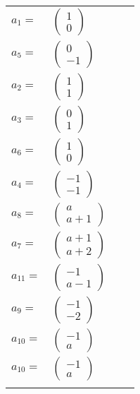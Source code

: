 \documentclass[1p]{elsarticle_modified}
\theoremstyle{definition}
\begin{document}
\begin{tabular}{m{7pt} m{180pt} m{7pt} m{180pt} }
\flushright $a_{1}=$&$\begin{pmatrix}1\\0\end{pmatrix}$ \\
\flushright $a_{5}=$&$\begin{pmatrix}0\\-1\end{pmatrix}$ \\
\flushright $a_{2}=$&$\begin{pmatrix}1\\1\end{pmatrix}$ \\
\flushright $a_{3}=$&$\begin{pmatrix}0\\1\end{pmatrix}$ \\
\flushright $a_{6}=$&$\begin{pmatrix}1\\0\end{pmatrix}$ \\
\flushright $a_{4}=$&$\begin{pmatrix}-1\\-1\end{pmatrix}$ \\
\flushright $a_{8}=$&$\begin{pmatrix}a\\a+1\end{pmatrix}$ \\
\flushright $a_{7}=$&$\begin{pmatrix}a+1\\a+2\end{pmatrix}$ \\
\flushright $a_{11}=$&$\begin{pmatrix}-1\\a-1\end{pmatrix}$ \\
\flushright $a_{9}=$&$\begin{pmatrix}-1\\-2\end{pmatrix}$ \\
\flushright $a_{10}=$&$\begin{pmatrix}-1\\a\end{pmatrix}$\\ \flushright $a_{10}=$&$\begin{pmatrix}-1\\a\end{pmatrix}$\\&\end{tabular}
\end{document}

